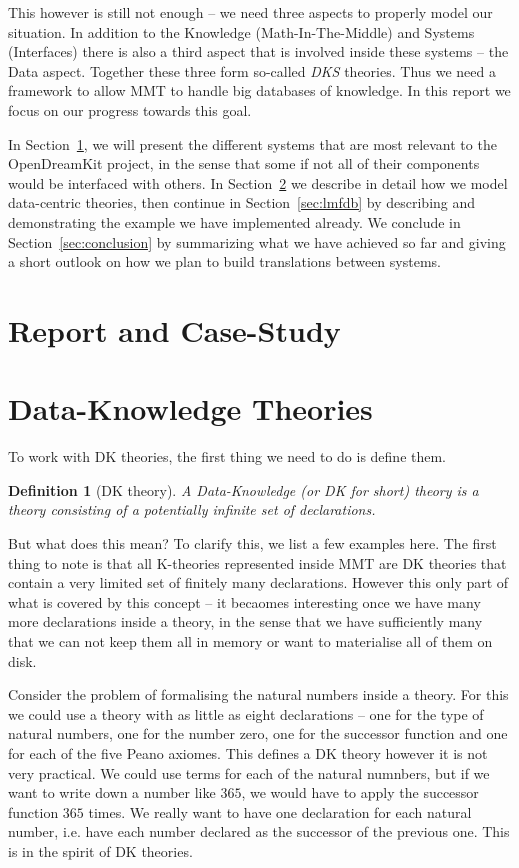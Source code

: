 \documentclass{deliverablereport}
\newtheorem{mydef}{Definition}
\begin{document}
This however is still not enough -- we need three aspects to properly model our situation. In addition to the Knowledge (Math-In-The-Middle) and Systems (Interfaces) there is also a third aspect that is involved inside these systems -- the Data aspect. Together these three form so-called \textit{DKS} theories. Thus we need a framework to allow MMT to handle big databases of knowledge. In this report we focus on our progress towards this goal.



In Section~\ref{casestudy}, we will present the different systems that are most relevant to the OpenDreamKit project, in the sense that some if not all of their components would be interfaced with others.
In Section~\ref{sec:data} we describe in detail how we model data-centric theories, then continue in Section~\ref{sec:lmfdb} by describing and demonstrating the example we have implemented already. We conclude in Section~\ref{sec:conclusion} by summarizing what we have achieved so far and giving a short outlook on how we plan to build translations between systems.

\section{Report and Case-Study}\label{casestudy}

\section{Data-Knowledge Theories}\label{sec:data}

To work with DK theories, the first thing we need to do is define them.
\begin{mydef}[DK theory]
  A Data-Knowledge (or DK for short) theory is a theory consisting of a potentially infinite set of declarations.
\end{mydef}

But what does this mean? To clarify this, we list a few examples here. The first thing to note is that all K-theories represented inside MMT are DK theories that contain a very limited set of finitely many declarations. However this only part of what is covered by this concept -- it becaomes interesting once we have many more declarations inside a theory, in the sense that we have sufficiently many that we can not keep them all in memory or want to materialise all of them on disk.

Consider the problem of formalising the natural numbers inside a theory. For this we could use a theory with as little as eight declarations -- one for the type of natural numbers, one for the number zero, one for the successor function and one for each of the five Peano axiomes. This defines a DK theory however it is not very practical. We could use terms for each of the natural numnbers, but if we want to write down a number like $365$, we would have to apply the successor function $365$ times. We really want to have one declaration for each natural number, i.e. have each number declared as the successor of the previous one. This is in the spirit of DK theories.
\end{document}
